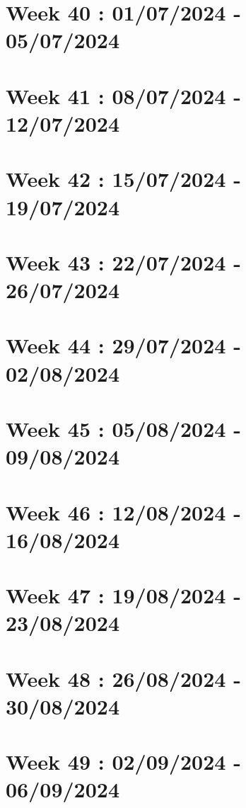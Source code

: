 \documentclass[french]{article}
\begin{document}
	\section{Week 40 : 01/07/2024 - 05/07/2024}
	

	\section{Week 41 : 08/07/2024 - 12/07/2024}
	

	\section{Week 42 : 15/07/2024 - 19/07/2024}
	

	\section{Week 43 : 22/07/2024 - 26/07/2024}
	

	\section{Week 44 : 29/07/2024 - 02/08/2024}
	

	\section{Week 45 : 05/08/2024 - 09/08/2024}
	

	\section{Week 46 : 12/08/2024 - 16/08/2024}
	

	\section{Week 47 : 19/08/2024 - 23/08/2024}
	

	\section{Week 48 : 26/08/2024 - 30/08/2024}
	

	\section{Week 49 : 02/09/2024 - 06/09/2024}
	
\end{document}
